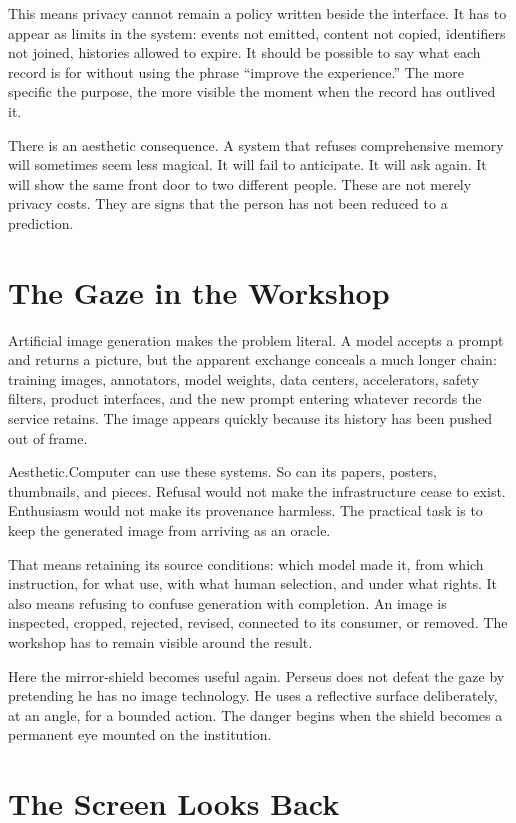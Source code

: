 \documentclass[11pt,letterpaper]{article}
\newcommand{\ac}{Aesthetic\textcolor{acpink}{.}Computer}
\begin{document}
This means privacy cannot remain a policy written beside the interface. It has
to appear as limits in the system: events not emitted, content not copied,
identifiers not joined, histories allowed to expire. It should be possible to
say what each record is for without using the phrase ``improve the experience.''
The more specific the purpose, the more visible the moment when the record has
outlived it.

There is an aesthetic consequence. A system that refuses comprehensive memory
will sometimes seem less magical. It will fail to anticipate. It will ask again.
It will show the same front door to two different people. These are not merely
privacy costs. They are signs that the person has not been reduced to a
prediction.

\section{The Gaze in the Workshop}

Artificial image generation makes the problem literal. A model accepts a prompt
and returns a picture, but the apparent exchange conceals a much longer chain:
training images, annotators, model weights, data centers, accelerators, safety
filters, product interfaces, and the new prompt entering whatever records the
service retains. The image appears quickly because its history has been pushed
out of frame.

\ac{} can use these systems. So can its papers, posters, thumbnails, and pieces.
Refusal would not make the infrastructure cease to exist. Enthusiasm would not
make its provenance harmless. The practical task is to keep the generated image
from arriving as an oracle.

That means retaining its source conditions: which model made it, from which
instruction, for what use, with what human selection, and under what rights. It
also means refusing to confuse generation with completion. An image is inspected,
cropped, rejected, revised, connected to its consumer, or removed. The workshop
has to remain visible around the result.

Here the mirror-shield becomes useful again. Perseus does not defeat the gaze by
pretending he has no image technology. He uses a reflective surface deliberately,
at an angle, for a bounded action. The danger begins when the shield becomes a
permanent eye mounted on the institution.

\section{The Screen Looks Back}
\end{document}
